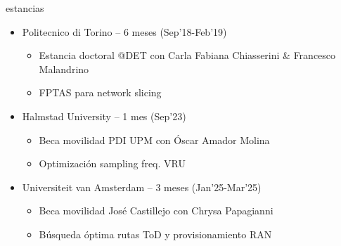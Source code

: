 \documentclass[xcolor=table,xcolor=x11names]{beamer}
\begin{document}
\begin{frame}{\secname}{estancias}
    \begin{itemize}
        \item Politecnico di Torino -- 6 meses (Sep'18-Feb'19)
            \begin{itemize}
                \item Estancia doctoral @DET con
                    Carla Fabiana Chiasserini \&
                    Francesco Malandrino
                \item FPTAS para network slicing
            \end{itemize}
        \item Halmstad University -- 1 mes (Sep'23)
            \begin{itemize}
                \item Beca movilidad PDI UPM con Óscar Amador Molina
                \item Optimización sampling freq. VRU
            \end{itemize}
        \item Universiteit van Amsterdam -- 3 meses (Jan'25-Mar'25)
            \begin{itemize}
                \item Beca movilidad José Castillejo con Chrysa Papagianni
                \item Búsqueda óptima rutas ToD y provisionamiento
                    RAN
            \end{itemize}
    \end{itemize}
\end{frame}
\end{document}
